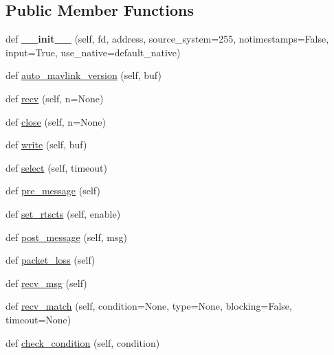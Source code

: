 \subsection*{Public Member Functions}
\begin{DoxyCompactItemize}
\item 
\mbox{\label{classpymavlink_1_1mavutil_1_1mavfile_ada7e64b5a58fbc8c527b0db3a31cf631}} 
def {\bfseries \+\_\+\+\_\+init\+\_\+\+\_\+} (self, fd, address, source\+\_\+system=255, notimestamps=False, input=True, use\+\_\+native=default\+\_\+native)
\item 
def \hyperlink{classpymavlink_1_1mavutil_1_1mavfile_af0f0faf1986ca88353787674f7575862}{auto\+\_\+mavlink\+\_\+version} (self, buf)
\item 
def \hyperlink{classpymavlink_1_1mavutil_1_1mavfile_a09cb800fc6b03949ace05ce320539be2}{recv} (self, n=None)
\item 
def \hyperlink{classpymavlink_1_1mavutil_1_1mavfile_a83f651dbc2487f6e45599e69d080ef1e}{close} (self, n=None)
\item 
def \hyperlink{classpymavlink_1_1mavutil_1_1mavfile_a8f40348c156083384c07dfa73cf92a62}{write} (self, buf)
\item 
def \hyperlink{classpymavlink_1_1mavutil_1_1mavfile_a205cfc15609088ced70b140c33c2c6d3}{select} (self, timeout)
\item 
def \hyperlink{classpymavlink_1_1mavutil_1_1mavfile_ad0ea96f4450b27d0327d9060d55e05be}{pre\+\_\+message} (self)
\item 
def \hyperlink{classpymavlink_1_1mavutil_1_1mavfile_a2607aae0fda1190034889d9e1c585539}{set\+\_\+rtscts} (self, enable)
\item 
def \hyperlink{classpymavlink_1_1mavutil_1_1mavfile_a6307d32e7cc751320cb1fe84a1a43049}{post\+\_\+message} (self, msg)
\item 
def \hyperlink{classpymavlink_1_1mavutil_1_1mavfile_abb4396fef91c8b5768ed865dd441286f}{packet\+\_\+loss} (self)
\item 
def \hyperlink{classpymavlink_1_1mavutil_1_1mavfile_acf32945bf305666d12d8a1bf32ae6893}{recv\+\_\+msg} (self)
\item 
def \hyperlink{classpymavlink_1_1mavutil_1_1mavfile_a7baa4911cf9de819dc682f2904bf4352}{recv\+\_\+match} (self, condition=None, type=None, blocking=False, timeout=None)
\item 
def \hyperlink{classpymavlink_1_1mavutil_1_1mavfile_a8875f5c51e7b332f252af3b6b19fcf23}{check\+\_\+condition} (self, condition)

\end{DoxyCompactItemize}
